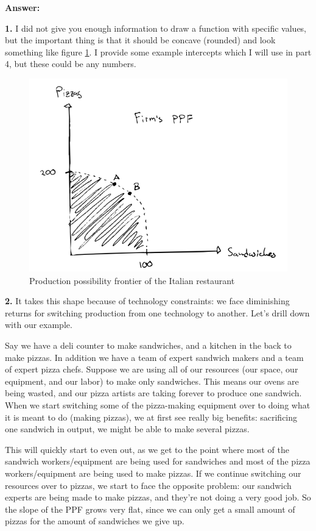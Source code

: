 \documentclass[12pt]{article}
\begin{document}
\textbf{Answer:}

\textbf{1.} I did not give you enough information to draw a function with specific values, but the important thing is that it should be concave (rounded) and look something like figure \ref{fig:PPF}. I provide some example intercepts which I will use in part 4, but these could be any numbers.

\begin{figure}
    \centering
    \includegraphics[width=.75\textwidth]{PPF.png}
    \caption{Production possibility frontier of the Italian restaurant}
    \label{fig:PPF}
\end{figure}

\medskip

\textbf{2.} It takes this shape because of technology constraints: we face diminishing returns for switching production from one technology to another. Let's drill down with our example.

\medskip

Say we have a deli counter to make sandwiches, and a kitchen in the back to make pizzas. In addition we have a team of expert sandwich makers and a team of expert pizza chefs. Suppose we are using all of our resources (our space, our equipment, and our labor) to make only sandwiches. This means our ovens are being wasted, and our pizza artists are taking forever to produce one sandwich. When we start switching some of the pizza-making equipment over to doing what it is meant to do (making pizzas), we at first see really big benefits: sacrificing one sandwich in output, we might be able to make several pizzas. 

\medskip

This will quickly start to even out, as we get to the point where most of the sandwich workers/equipment are being used for sandwiches and most of the pizza workers/equipment are being used to make pizzas. If we continue switching our resources over to pizzas, we start to face the opposite problem: our sandwich experts are being made to make pizzas, and they're not doing a very good job. So the slope of the PPF grows very flat, since we can only get a small amount of pizzas for the amount of sandwiches we give up.
\end{document}
